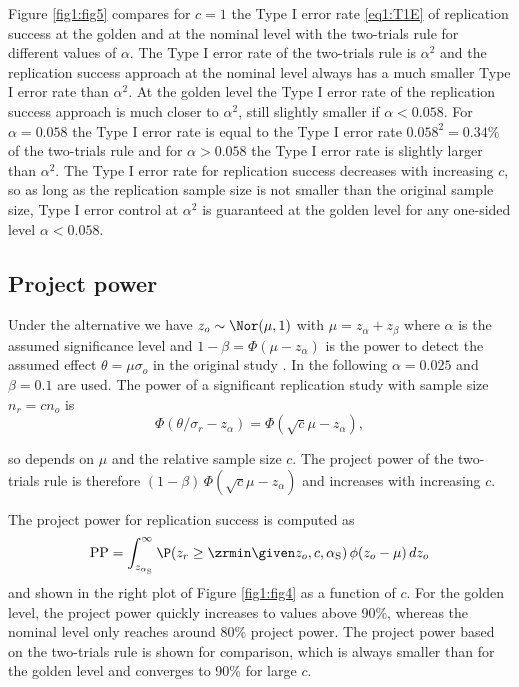 Figure \ref{fig1:fig5} compares for $c=1$ the Type I error rate \eqref{eq1:T1E} of
replication success at the golden and at the nominal level with the two-trials
rule for different values of $\alpha$. The Type I error rate of the two-trials
rule is $\alpha^2$ and the replication success approach at the nominal level
always has a much smaller Type I error rate than $\alpha^2$. At the golden level
the Type I error rate of the replication success approach is much closer to
$\alpha^2$, still slightly smaller if $\alpha < 0.058$. For $\alpha = 0.058$ the
Type I error rate is equal to the Type I error rate $0.058^2 = 0.34\%$ of the
two-trials rule and for $\alpha > 0.058$ the Type I error rate is slightly
larger than $\alpha^2$. The Type I error rate for replication success decreases
with increasing $c$, so as long as the replication sample size is not smaller
than the original sample size, Type I error control at $\alpha^2$ is guaranteed
at the golden level for any one-sided level $\alpha < 0.058$.

\subsection{Project power}\label{sec1:PP}
Under the alternative we have $z_o\sim \Nor(\mu, 1)$ with
$\mu = z_\alpha + z_\beta$ where $\alpha$ is the assumed significance level and
$1-\beta = \Phi(\mu - z_\alpha)$ is the power to detect the assumed effect
$\theta = \mu \sigma_o$ in the original study \citep[Section 3.3]{Matthews2006}.
In the following $\alpha=0.025$ and $\beta=0.1$ are used. The power of a
significant replication study with sample size $n_r = c n_o$ is
\begin{equation*}
\Phi(\theta/\sigma_r - z_\alpha) =
\Phi(\sqrt{c} \mu - z_\alpha),
\end{equation*}

so depends on $\mu$ and the relative sample size $c$. The project power of the
two-trials rule is therefore $(1-\beta) \, \Phi(\sqrt{c} \mu - z_\alpha)$ and
increases with increasing $c$.


The project power for replication success is computed as
\begin{equation*}
  \mbox{PP} = \int_{z_{\alpha_{\mathrm{S}}}}^{\infty}
\P(z_r \geq \zrmin \given z_o, c, \alpha_{\mathrm{S}}) \,
  \phi(z_o - \mu) \, dz_o
\end{equation*}
and shown in the right plot of Figure \ref{fig1:fig4} as a function of $c$. For
the golden level, the project power quickly increases to values above 90\%,
whereas the nominal level only reaches around 80\% project power. The project
power based on the two-trials rule is shown for comparison, which is always
smaller than for the golden level and converges to 90\% for large $c$.

